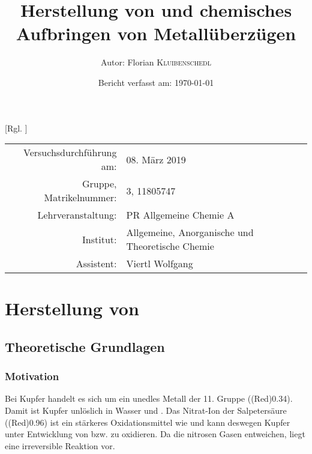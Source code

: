 \documentclass{article}
\title{Herstellung von \ch{CuSO4 * 5 H2O} und chemisches Aufbringen von Metallüberzügen \cite{Versuchsvorschrift}} %
\author{Autor: Florian \textsc{Kluibenschedl}} %
\date{Bericht verfasst am: \today} %
\begin{document}
  [Rgl. ]{}{}
  
  \maketitle %
  
  \begin{center}
    \begin{tabular}{r p{4cm}}
      Versuchsdurchführung am: & 08. März 2019\\ %
      Gruppe, Matrikelnummer: & 3, 11805747 \\
      Lehrveranstaltung: & PR Allgemeine Chemie A \\
      Institut: & Allgemeine, Anorganische und Theoretische Chemie \\
      Assistent: & Viertl Wolfgang %
    \end{tabular}
  \end{center}


  \begin{abstract}
    
  \end{abstract}
  
  \pagebreak
  
  \section{Herstellung von }
  
    \subsection{Theoretische Grundlagen}
  
      \subsubsection{Motivation} \label{sec:MotivationKupfer}
        
        Bei Kupfer handelt es sich um ein unedles Metall der 11. Gruppe (\ElPot[superscript=0](Red){0.34}). Damit ist Kupfer unlöslich in Wasser und . Das Nitrat-Ion der Salpetersäure (\ElPot[superscript=0](Red){0.96}) ist ein stärkeres Oxidationsmittel wie  und kann deswegen Kupfer unter Entwicklung von  bzw.  zu  oxidieren. Da die nitrosen Gasen entweichen, liegt eine irreversible Reaktion vor.
        
\end{document}
